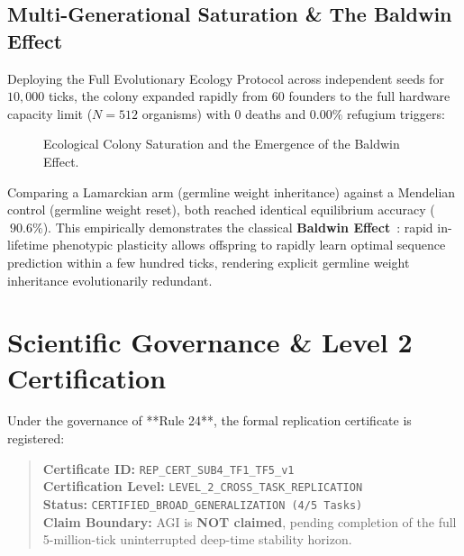 \documentclass[10pt,journal,compsoc]{IEEEtran}
\begin{document}
\subsection{Multi-Generational Saturation \& The Baldwin Effect}
Deploying the Full Evolutionary Ecology Protocol across independent seeds for $10,000$ ticks, the colony expanded rapidly from 60 founders to the full hardware capacity limit ($N = 512$ organisms) with $0$ deaths and $0.00\%$ refugium triggers:

\begin{figure}[!ht]
\centering
{}
\caption{Ecological Colony Saturation and the Emergence of the Baldwin Effect.}
\label{fig:baldwin}
\end{figure}

Comparing a Lamarckian arm (germline weight inheritance) against a Mendelian control (germline weight reset), both reached identical equilibrium accuracy ($~90.6\%$). This empirically demonstrates the classical \textbf{Baldwin Effect}~\cite{baldwin1896new}: rapid in-lifetime phenotypic plasticity allows offspring to rapidly learn optimal sequence prediction within a few hundred ticks, rendering explicit germline weight inheritance evolutionarily redundant.

\section{Scientific Governance \& Level 2 Certification}
\label{sec:governance}

Under the governance of **Rule 24**, the formal replication certificate is registered:

\begin{quote}
\textbf{Certificate ID:} \texttt{REP\_CERT\_SUB4\_TF1\_TF5\_v1} \\
\textbf{Certification Level:} \texttt{LEVEL\_2\_CROSS\_TASK\_REPLICATION} \\
\textbf{Status:} \texttt{CERTIFIED\_BROAD\_GENERALIZATION (4/5 Tasks)} \\
\textbf{Claim Boundary:} AGI is \textbf{NOT claimed}, pending completion of the full 5-million-tick uninterrupted deep-time stability horizon.
\end{quote}
\end{document}
